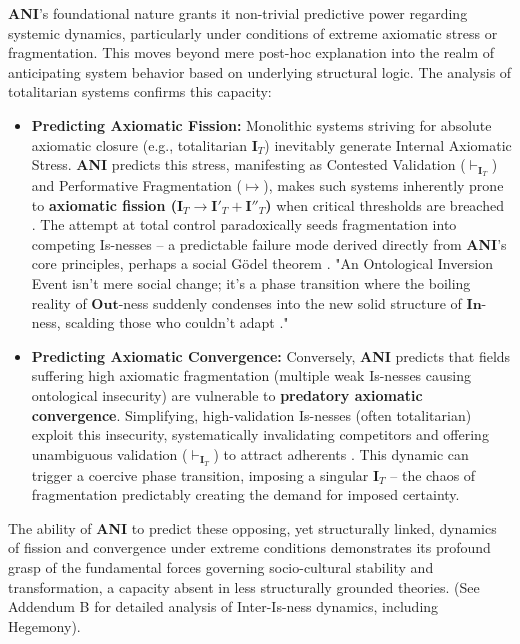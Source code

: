 \documentclass{article}
\newcommand{\ANI}{\textbf{ANI}}             %
\newcommand{\Isness}{\mathbf{I}}            %
\newcommand{\Inness}{\mathbf{In}}           %
\newcommand{\Outness}{\mathbf{Out}}         %
\newcommand{\enactment}{\ensuremath{\mapsto}} %
\newcommand{\validates}[1]{\ensuremath{\vdash_{#1}}} %
\begin{document}
\ANI{}'s foundational nature grants it non-trivial predictive power regarding systemic dynamics, particularly under conditions of extreme axiomatic stress or fragmentation. This moves beyond mere post-hoc explanation into the realm of anticipating system behavior based on underlying structural logic. The analysis of totalitarian systems confirms this capacity:
\begin{itemize}
    \item \textbf{Predicting Axiomatic Fission:} Monolithic systems striving for absolute axiomatic closure (e.g., totalitarian $\Isness_T$) inevitably generate Internal Axiomatic Stress. \ANI{} predicts this stress, manifesting as Contested Validation ($\validates{\Isness_T}$) and Performative Fragmentation ($\enactment$), makes such systems inherently prone to \textbf{axiomatic fission ($\Isness_T \rightarrow \Isness'_T + \Isness''_T$)} when critical thresholds are breached \citep{Arendt1951}. The attempt at total control paradoxically seeds fragmentation into competing Is-nesses – a predictable failure mode derived directly from \ANI{}'s core principles, perhaps a social Gödel theorem \citep{Hofstadter1979}. "An Ontological Inversion Event isn't mere social change; it's a phase transition where the boiling reality of $\Outness$-ness suddenly condenses into the new solid structure of $\Inness$-ness, scalding those who couldn't adapt \citep{Prigogine1984}."
    \item \textbf{Predicting Axiomatic Convergence:} Conversely, \ANI{} predicts that fields suffering high axiomatic fragmentation (multiple weak Is-nesses causing ontological insecurity) are vulnerable to \textbf{predatory axiomatic convergence}. Simplifying, high-validation Is-nesses (often totalitarian) exploit this insecurity, systematically invalidating competitors and offering unambiguous validation ($\validates{\Isness_T}$) to attract adherents \citep{Festinger1956}. This dynamic can trigger a coercive phase transition, imposing a singular $\Isness_T$ – the chaos of fragmentation predictably creating the demand for imposed certainty.
\end{itemize}
The ability of \ANI{} to predict these opposing, yet structurally linked, dynamics of fission and convergence under extreme conditions demonstrates its profound grasp of the fundamental forces governing socio-cultural stability and transformation, a capacity absent in less structurally grounded theories. (See Addendum B for detailed analysis of Inter-Is-ness dynamics, including Hegemony).
\end{document}
